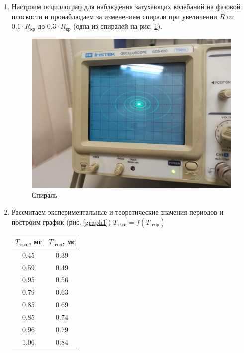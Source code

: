\documentclass[a4paper, 12pt]{article}
\begin{document}
\begin{enumerate}
        \item Настроим осциллограф для наблюдения затухающих колебаний на фазовой плоскости и пронаблюдаем за изменением спирали при увеличении $R$ от $0.1 \cdot R_{кр}$ до $0.3 \cdot R_{кр}$ (одна из спиралей на рис. \ref{spiral}).
        
        \begin{figure}
            \includegraphics[scale=0.25]{spiral.jpg}
            \caption{Спираль}
            \label{spiral}
        \end{figure}

        \item Рассчитаем экспериментальные и теоретические значения периодов и построим график (рис. \ref{graph1}) $T_{эксп} = f(T_{теор})$
        
        \begin{tabular}{|c|c|} \hline
            $T_{эксп}$, мс & $T_{теор}$, мс \\ \hline
            0.45 & 0.39 \\ \hline
            0.59 & 0.49 \\ \hline
            0.95 & 0.56 \\ \hline
            0.79 & 0.63 \\ \hline
            0.85 & 0.69 \\ \hline
            0.85 & 0.74 \\ \hline
            0.96 & 0.79 \\ \hline
            1.06 & 0.84 \\ \hline
        \end{tabular}


\end{enumerate}
\end{document}
